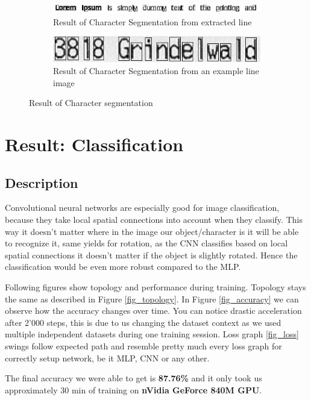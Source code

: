 \documentclass[Report.tex]{subfiles}
\begin{document}
\begin{figure}[H]
  \begin{subfigure}[t]{\textwidth}
    \centering
    \includegraphics[height=0.45cm]{res/segment_letter1.png}
    \caption{Result of Character Segmentation from extracted line}
  \end{subfigure}
  \begin{subfigure}[t]{\textwidth}
    \centering
    \includegraphics[width=12cm]{res/segment_letter2.png}
    \caption{Result of Character Segmentation from an example line image}
  \end{subfigure}
  \caption{Result of Character segmentation}
  \label{fig:Character_segmentation}
\end{figure}

\section{Result: Classification}
\subsection{Description}
\begin{flushleft}
  Convolutional neural networks are especially good for image
  classification, because they take local spatial connections into account when
  they classify. This way it doesn't matter where in the image our
  object/character is it will be able to recognize it, same yields for rotation,
  as the CNN classifies based on local spatial connections it doesn't matter if
  the object is slightly rotated. Hence the classification would be even more robust compared to the MLP.\par
  
  Following figures show topology and performance during training.
  Topology stays the same as described in Figure \ref{fig_topology}.
  In Figure \ref{fig_accuracy} we can observe how the accuracy changes over time.
  You can notice drastic acceleration after 2'000 steps, this is due to us changing the dataset context as we used multiple independent datasets during one training session.
  Loss graph \ref{fig_loss} swings follow expected path and resemble pretty much every loss graph for correctly setup network, be it MLP, CNN or any other.
  
  The final accuracy we were able to get is \textbf{87.76\%} and it only took us approximately 30 min of training on \textbf{nVidia GeForce 840M GPU}.
\end{flushleft}
\end{document}
